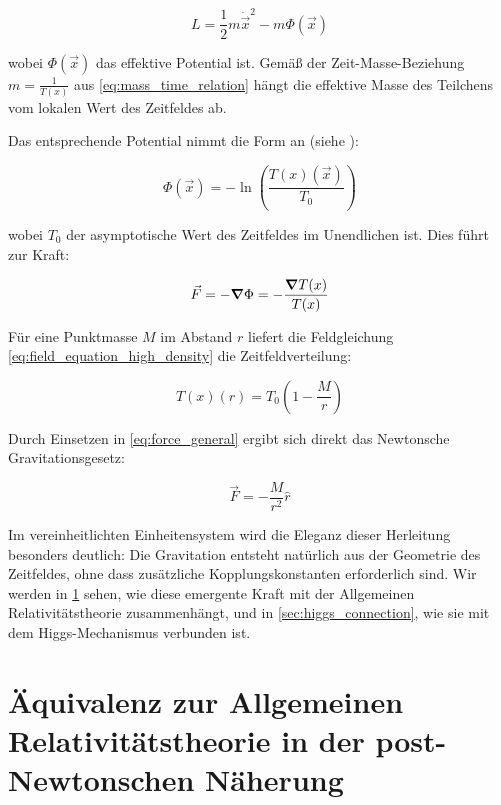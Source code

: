 \documentclass[12pt,a4paper]{article}
\newcommand{\Tfield}{T(x)}
\newcommand{\Tzero}{T_0}
\newcommand{\vecx}{\vec{x}}
\begin{document}
	\begin{equation}
		\label{eq:particle_lagrangian}
		L = \frac{1}{2}m\dot{\vecx}^2 - m\Phi(\vecx)
	\end{equation}
	
	wobei \(\Phi(\vecx)\) das effektive Potential ist. Gemäß der Zeit-Masse-Beziehung \(m = \frac{1}{\Tfield}\) aus \cref{eq:mass_time_relation} hängt die effektive Masse des Teilchens vom lokalen Wert des Zeitfeldes ab.
	
	Das entsprechende Potential nimmt die Form an (siehe \cite{pascher_galaxies_2025}):
	
	\begin{equation}
		\label{eq:effective_potential}
		\Phi(\vecx) = -\ln\left(\frac{\Tfield(\vecx)}{\Tzero}\right)
	\end{equation}
	
	wobei \(\Tzero\) der asymptotische Wert des Zeitfeldes im Unendlichen ist. Dies führt zur Kraft:
	
	\begin{equation}
		\label{eq:force_general}
		\vec{F} = -\grad \Phi = -\frac{\grad \Tfield}{\Tfield}
	\end{equation}
	
	Für eine Punktmasse \(M\) im Abstand \(r\) liefert die Feldgleichung \cref{eq:field_equation_high_density} die Zeitfeldverteilung:
	
	\begin{equation}
		\label{eq:time_field_point_mass}
		\Tfield(r) = \Tzero\left(1 - \frac{M}{r}\right)
	\end{equation}
	
	Durch Einsetzen in \cref{eq:force_general} ergibt sich direkt das Newtonsche Gravitationsgesetz:
	
	\begin{equation}
		\label{eq:newton_law}
		\vec{F} = -\frac{M}{r^2} \hat{r}
	\end{equation}
	
	Im vereinheitlichten Einheitensystem wird die Eleganz dieser Herleitung besonders deutlich: Die Gravitation entsteht natürlich aus der Geometrie des Zeitfeldes, ohne dass zusätzliche Kopplungskonstanten erforderlich sind. Wir werden in \cref{sec:gr_equivalence} sehen, wie diese emergente Kraft mit der Allgemeinen Relativitätstheorie zusammenhängt, und in \cref{sec:higgs_connection}, wie sie mit dem Higgs-Mechanismus verbunden ist.
	
	\section{Äquivalenz zur Allgemeinen Relativitätstheorie in der post-Newtonschen Näherung}
	\label{sec:gr_equivalence}
	
\end{document}
